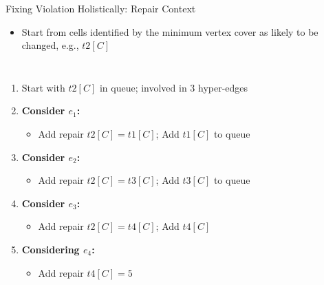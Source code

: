 \documentclass[aspectratio=169]{../latex_main/tntbeamer}  %
\begin{document}
\begin{frame}[c]{Fixing Violation Holistically: Repair Context}

\begin{itemize}
    \item Start from cells identified by the minimum vertex cover as likely to be changed, e.g., \( t2[C] \)
\end{itemize}
    
    \begin{columns}
    

    \begin{enumerate}
        \item Start with \( t2[C] \) in queue; involved in 3 hyper-edges
        \item \textbf{Consider \( e_1 \):}
        \begin{itemize}
            \item Add repair \( t2[C] = t1[C] \); Add \( t1[C] \) to queue
        \end{itemize}
        \item \textbf{Consider \( e_2 \):}
        \begin{itemize}
            \item Add repair \( t2[C] = t3[C] \); Add \( t3[C] \) to queue
        \end{itemize}
        \item \textbf{Consider \( e_3 \):}
        \begin{itemize}
            \item Add repair \( t2[C] = t4[C] \); Add \( t4[C] \)
        \end{itemize}
        \item \textbf{Considering \( e_4 \):}
        \begin{itemize}
            \item Add repair \( t4[C] = 5 \)
        \end{itemize}
    \end{enumerate}
    
    

\end{columns}
\end{frame}
\end{document}
